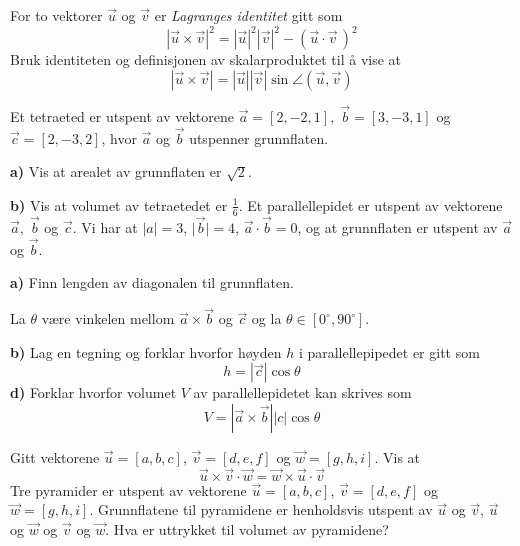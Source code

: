 For to vektorer $ \vec{u} $ og $ \vec{v} $ er \textit{Lagranges identitet} gitt som
\[ |\vec{u}\times\vec{v}|^2=|\vec{u}|^2|\vec{v}|^2-(\vec{u}\cdot\vec{v}\,)^2 \]
Bruk identiteten og definisjonen av skalarproduktet til å vise at
\[ |\vec{u}\times\vec{v}|=|\vec{u}||\vec{v}|\sin \angle(\vec{u}, \vec{v})  \]\vs

Et tetraeted er utspent av vektorene $ \vec{a}=[2, -2, 1],\; \vec{b}=[3, -3, 1] $ og $ \vec{c}=[2, -3, 2] $, hvor $ \vec{a} $ og $ \vec{b} $ utspenner grunnflaten.\os

\textbf{a)} Vis at arealet av grunnflaten er $ \sqrt{2} $.\os

\textbf{b)} Vis at volumet av tetraetedet er $ \frac{1}{6} $.
\newpage
{}
Et parallellepidet er utspent av vektorene $ \vec{a},\; \vec{b} $ og $ \vec{c} $. Vi har at ${|a|=3}$,  $|{\vec{b}|=4}$, $ {\vec{a}\cdot \vec{b}=0}  $, og at grunnflaten er utspent av $ \vec{a} $ og $ \vec{b} $. \os

\textbf{a)} Finn lengden av diagonalen til grunnflaten.\os

La $ \theta $ være vinkelen mellom $ {\vec{a}\times\vec{b}} $ og $ \vec{c} $ og la $ {\theta\in[0^\circ, 90^\circ]} $.\os

\textbf{b)} Lag en tegning og forklar hvorfor høyden $ h $ i parallellepipedet er gitt som
\[ h= |\vec{c}|\cos \theta \]
\textbf{d)} Forklar hvorfor volumet $ V $ av parallellepidetet kan skrives som
\[ V= |\vec{a}\times\vec{b}||c|\cos \theta\]\vs

Gitt vektorene $ \vec{u}=[a, b, c] $, $ \vec{v}=[d, e, f] $ og $ \vec{w}=[g, h, i] $. Vis at
\[ \vec{u}\times\vec{v}\cdot\vec{w}= \vec{w}\times\vec{u}\cdot\vec{v}\]
Tre pyramider er utspent av vektorene $ \vec{u}=[a, b, c] $, $ \vec{v}=[d, e, f] $ og $ \vec{w}=[g, h, i] $. Grunnflatene til pyramidene er henholdsvis utspent av $ \vec{u} $ og $ \vec{v} $, $ \vec{u} $ og $ \vec{w} $ og $ \vec{v} $ og $ \vec{w} $. Hva er uttrykket til volumet av pyramidene?


